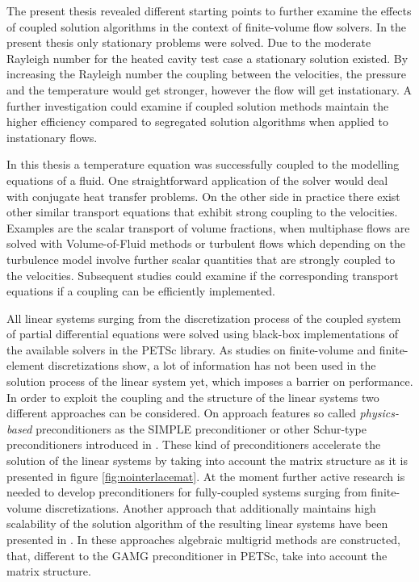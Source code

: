 The present thesis revealed different starting points to further examine the effects of coupled solution algorithms in the context of finite-volume flow solvers. In the present thesis only stationary problems were solved. Due to the moderate Rayleigh number for the heated cavity test case a stationary solution existed. By increasing the Rayleigh number the coupling between the velocities, the pressure and the temperature would get stronger, however the flow will get instationary. A further investigation could examine if coupled solution methods maintain the higher efficiency compared to segregated solution algorithms when applied to instationary flows.

In this thesis a temperature equation was successfully coupled to the modelling equations of a fluid. One straightforward application of the solver would deal with conjugate heat transfer problems. On the other side in practice there exist other similar transport equations that exhibit strong coupling to the velocities. Examples are the scalar transport of volume fractions, when multiphase flows are solved with Volume-of-Fluid methods or turbulent flows which depending on the turbulence model involve further scalar quantities that are strongly coupled to the velocities. Subsequent studies could examine if the corresponding transport equations if a coupling can be efficiently implemented.

All linear systems surging from the discretization process of the coupled system of partial differential equations were solved using black-box implementations of the available solvers in the PETSc library. As studies on finite-volume \cite{klaij13,darwish09,mairin14} and finite-element \cite{brown12,elman03,elman08,silvester01,turek02,mkcinnes14} discretizations show, a lot of information has not been used in the solution process of the linear system yet, which imposes a barrier on performance. In order to exploit the coupling and the structure of the linear systems two different approaches can be considered. On approach features so called \emph{physics-based} preconditioners as the SIMPLE preconditioner or other Schur-type preconditioners introduced in \cite{klaij13,elman08}. These kind of preconditioners accelerate the solution of the linear systems by taking into account the matrix structure as it is presented in figure \ref{fig:nointerlacemat}. At the moment further active research is needed to develop preconditioners for fully-coupled systems surging from finite-volume discretizations. Another approach that additionally maintains high scalability of the solution algorithm of the resulting linear systems have been presented in \cite{darwish09,marin14}. In these approaches algebraic multigrid methods are constructed, that, different to the GAMG preconditioner in PETSc, take into account the matrix structure.

